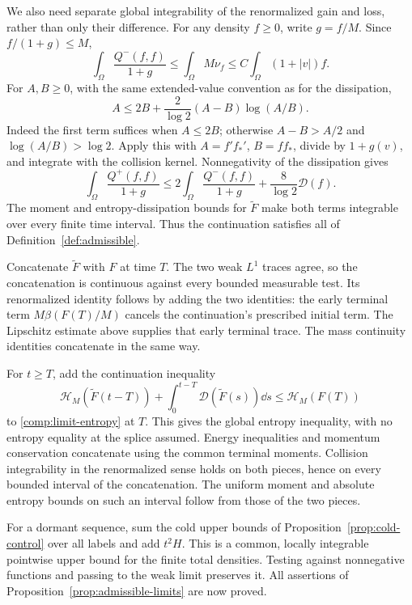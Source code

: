 We also need separate global integrability of the renormalized gain and
loss, rather than only their difference. For any density \(f\ge0\),
write \(g=f/M\). Since \(f/(1+g)\le M\),
\[
\int_\Omega\frac{Q^-(f,f)}{1+g}
\le\int_\Omega M\nu_f
\le C\int_\Omega(1+|v|)f.
\]
For \(A,B\ge0\), with the same extended-value convention as for the
dissipation,
\[
A\le2B+\frac2{\log2}(A-B)\log(A/B).
\]
Indeed the first term suffices when \(A\le2B\); otherwise
\(A-B>A/2\) and \(\log(A/B)>\log2\). Apply this with
\(A=f'f_*'\), \(B=ff_*\), divide by \(1+g(v)\), and integrate
with the collision kernel. Nonnegativity of the dissipation gives
\[
\int_\Omega\frac{Q^+(f,f)}{1+g}
\le2\int_\Omega\frac{Q^-(f,f)}{1+g}
  +\frac8{\log2}\mathcal D(f).
\]
The moment and entropy-dissipation bounds for \(\widetilde F\) make
both terms integrable over every finite time interval. Thus the
continuation satisfies all of Definition~\ref{def:admissible}.

Concatenate \(\widetilde F\) with \(F\) at time \(T\).
The two weak \(L^1\) traces agree, so the concatenation is
continuous against every bounded measurable test. Its renormalized
identity follows by adding the two identities: the early terminal term
\(M\beta(F(T)/M)\) cancels the continuation's prescribed initial
term. The Lipschitz estimate above supplies that early terminal trace.
The mass continuity identities concatenate in the same way.

For \(t\geq T\), add the continuation inequality
\[
\mathcal H_M(\widetilde F(t-T))
 +\int_0^{t-T}\mathcal D(\widetilde F(s))\dd s
\leq\mathcal H_M(F(T))
\]
to \eqref{comp:limit-entropy} at \(T\). This gives the global entropy
inequality, with no entropy equality at the splice assumed. Energy
inequalities and momentum conservation concatenate using the common
terminal moments. Collision integrability in the renormalized sense
holds on both pieces, hence on every bounded interval of the
concatenation. The uniform moment and absolute entropy bounds on such
an interval follow from those of the two pieces.

For a dormant sequence, sum the cold upper bounds of
Proposition~\ref{prop:cold-control} over all labels and add \(t^2H\).
This is a common, locally integrable pointwise upper bound for the
finite total densities. Testing against nonnegative functions and
passing to the weak limit preserves it. All assertions of
Proposition~\ref{prop:admissible-limits} are now proved.
